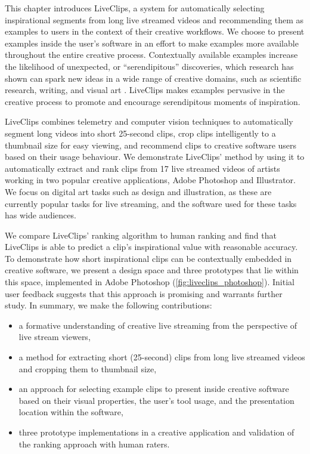 This chapter introduces LiveClips, a system for automatically selecting inspirational segments from long live streamed videos and recommending them as examples to users in the context of their creative workflows. We choose to present examples inside the user's software in an effort to make examples more available throughout the entire creative process.
Contextually available examples increase the likelihood of unexpected, or ``serendipitous'' discoveries, which research has shown can spark new ideas in a wide range of creative domains, such as scientific research, writing, and visual art \cite{Bawden1986, Benjamin2014, Foster2003, Erdelez1999}. LiveClips makes examples pervasive in the creative process to promote and encourage serendipitous moments of inspiration. 

LiveClips combines telemetry and computer vision techniques to automatically segment long videos into short 25-second clips, crop clips intelligently to a thumbnail size for easy viewing, and recommend clips to creative software users based on their usage behaviour. We demonstrate LiveClips' method by using it to automatically extract and rank clips from 17 live streamed videos of artists working in two popular creative applications, Adobe Photoshop and Illustrator. We focus on digital art tasks such as design and illustration, as these are currently popular tasks for live streaming, and the software used for these tasks has wide audiences.

We compare LiveClips' ranking algorithm to human ranking and find that LiveClips is able to predict a clip's inspirational value with reasonable accuracy. To demonstrate how short inspirational clips can be contextually embedded in creative software, we present a design space and three prototypes that lie within this space, implemented in Adobe Photoshop (\autoref{fig:liveclips_photoshop}). Initial user feedback suggests that this approach is promising and warrants further study. In summary, we make the following contributions:

\begin{itemize}
\item a formative understanding of creative live streaming from the perspective of live stream viewers,
\item a method for extracting short (25-second) clips from long live streamed videos and cropping them to thumbnail size,
\item an approach for selecting example clips to present inside creative software based on their visual properties, the user's tool usage, and the presentation location within the software,
\item three prototype implementations in a creative application and validation of the ranking approach with human raters. 
\end{itemize}
